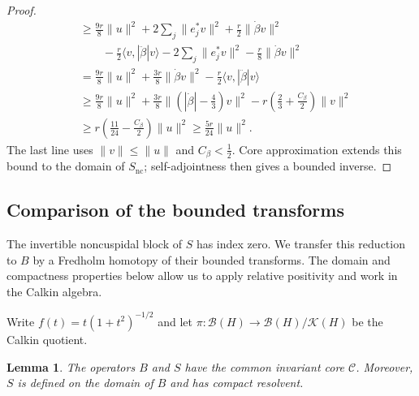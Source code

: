\documentclass[11pt]{article}
\theoremstyle{definition}
\theoremstyle{plain}
\numberwithin{equation}{section}
\newtheorem{lemma}[theorem]{Lemma}
\newcommand{\nc}{\mathrm{nc}}
\begin{document}
\begin{proof}
\begin{equation}
\begin{aligned}
 &\geq\frac{9r}{8}\|u\|^2
       +2\sum_j\|e_j^*v\|^2+\frac r2\|\dot\beta v\|^2\\
 &\qquad-\frac r2\langle v,|\ddot\beta|v\rangle
       -2\sum_j\|e_j^*v\|^2-\frac r8\|\dot\beta v\|^2\\
 &=\frac{9r}{8}\|u\|^2
       +\frac{3r}{8}\|\dot\beta v\|^2
       -\frac r2\langle v,|\ddot\beta|v\rangle\\
 &\geq\frac{9r}{8}\|u\|^2
       +\frac{3r}{8}\|(|\dot\beta|-\tfrac43)v\|^2
       -r\left(\frac23+\frac{C_\beta}{2}\right)\|v\|^2\\
 &\geq r\left(\frac{11}{24}-\frac{C_\beta}{2}\right)\|u\|^2
 \geq\frac{5r}{24}\|u\|^2.
 \end{aligned}
\end{equation}
The last line uses $\|v\|\leq\|u\|$ and $C_\beta<\tfrac12$.
Core approximation extends this bound to the domain of $S_{\nc}$;
self-adjointness then gives a bounded inverse.
\end{proof}
\subsection{Comparison of the bounded transforms}
\label{subsec:homotopy}

The invertible noncuspidal block of $S$ has index zero.
We transfer this reduction to $B$ by a Fredholm homotopy of
their bounded transforms. The domain and compactness properties
below allow us to apply relative positivity and work in the
Calkin algebra.

Write $f(t)=t(1+t^2)^{-1/2}$ and let
$\pi:\mathcal B(H)\to\mathcal B(H)/\mathcal K(H)$ be the Calkin quotient.

\begin{lemma}\label{lem:domains}
The operators $B$ and $S$ have the common invariant core $\mathcal C$.
Moreover, $S$ is defined on the domain of $B$ and has compact resolvent.
\end{lemma}
\end{document}
